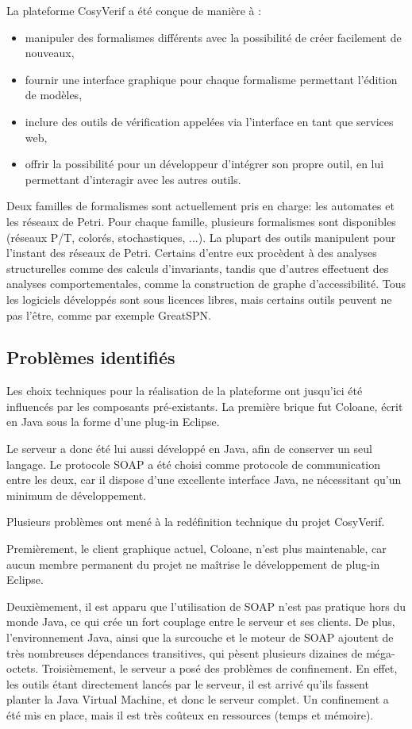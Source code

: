 \documentclass{report}
\begin{document}
La plateforme CosyVerif a été conçue de manière à :
\begin{itemize}
\item manipuler des formalismes différents avec la possibilité de créer facilement de nouveaux,
\item fournir une interface graphique pour chaque formalisme permettant l'édition de modèles,
\item inclure des outils de vérification appelées via l'interface en tant
  que services web,
\item offrir la possibilité pour un développeur d'intégrer son propre outil,
  en lui permettant d'interagir avec les autres outils.
\end{itemize}

Deux familles de formalismes sont actuellement pris en charge: les automates
et les réseaux de Petri. Pour chaque famille, plusieurs formalismes sont
disponibles (réseaux P/T, colorés, stochastiques, ...).
La plupart des outils manipulent pour l'instant des réseaux de Petri. Certains d'entre eux procèdent à des analyses structurelles comme 
des calculs d'invariants, tandis que d'autres effectuent des analyses
comportementales, comme la construction de graphe 
d'accessibilité.
Tous les logiciels développés sont sous licences libres, mais certains
outils peuvent ne pas l'être, comme par exemple GreatSPN.

\subsection{Problèmes identifiés}

Les choix techniques pour la réalisation de la plateforme ont jusqu'ici été
influencés par les composants pré-existants. La première brique fut Coloane,
écrit en Java sous la forme d'une plug-in Eclipse.

Le serveur a donc été lui aussi développé en Java, afin de conserver un seul
langage.
Le protocole SOAP a été choisi comme protocole de communication entre les
deux,
car il dispose d'une excellente interface Java, ne nécessitant qu'un minimum
de développement.

\medskip

Plusieurs problèmes ont mené à la redéfinition technique du projet
CosyVerif.

Premièrement, le client graphique actuel, Coloane, n'est plus maintenable, car aucun
membre permanent du projet ne maîtrise le développement de plug-in Eclipse.

Deuxièmement, il est apparu que l'utilisation de SOAP n'est pas
pratique hors du monde Java, ce qui crée un fort couplage entre le serveur et ses clients.
De plus, l'environnement Java, ainsi que la surcouche et le moteur de SOAP
ajoutent de très nombreuses dépendances transitives, qui pèsent plusieurs dizaines de méga-octets.
Troisièmement, le serveur a posé des problèmes de confinement. En effet, les
outils étant directement lancés par le serveur, il est arrivé qu'ils fassent
planter la Java Virtual Machine, et donc le serveur complet.
Un confinement a été mis en place, mais il est très coûteux en ressources
(temps et mémoire).
\end{document}
